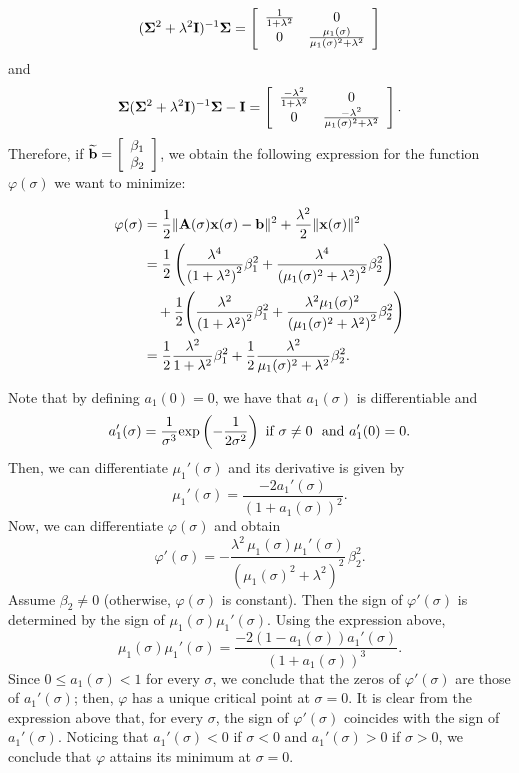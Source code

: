 \documentclass[onefignum,onetabnum]{siamart171218}
\newcommand{\bA}{{\bf A}}
\newcommand{\bI}{{\bf I}}
\newcommand{\bb}{{\bf b}}
\newcommand{\bx}{{\bf x}}
\newcommand{\bSigma}{{\bf \Sigma}}
\begin{document}
\[ (\bSigma^2 + \lambda^2 \bI)^{-1} \bSigma = \left[ \begin{array}{cc} \frac{1}{1+\lambda^2} & 0 \\  0 & \frac{\mu_1(\sigma)}{\mu_1(\sigma)^2+\lambda^2} \end{array}\right]\]
and
\[ \bSigma (\bSigma^2 + \lambda^2 \bI)^{-1} \bSigma  - \bI =  \left[ \begin{array}{cc} \frac{-\lambda^2}{1+\lambda^2} & 0 \\  0 & \frac{-\lambda^2}{\mu_1(\sigma)^2+\lambda^2} \end{array}\right].\] 
Therefore, if $\widetilde{\bb} = \left[ \begin{array}{c} \beta_1 \\ \beta_2\end{array}\right]$, we obtain
the following expression for the function $\varphi(\sigma)$ we want to minimize:

\begin{align*} 
\varphi(\sigma) &= \frac{1}{2} \| \bA(\sigma) \bx(\sigma) - \bb\|^2 + \frac{\lambda^2}{2} \| \bx(\sigma)\|^2 \\
&= \frac{1}{2} \left(\frac{\lambda^4}{\left(1 +\lambda^2\right)^2} \beta_1^2 +  \frac{\lambda^4}{\left(\mu_1(\sigma)^2+\lambda^2\right)^2} \beta_2^2 \right) \\ & \quad + \frac{1}{2}\Bigg(\frac{\lambda^2}{\left(1 +\lambda^2\right)^2} \beta_1^2 +  \frac{\lambda^2\mu_1(\sigma)^2}{\left(\mu_1(\sigma)^2+\lambda^2\right)^2} \beta_2^2 \Bigg)\\
&= \frac{1}{2}\frac{\lambda^2}{1 +\lambda^2} \beta_1^2 +  \frac{1}{2}\frac{\lambda^2}{\mu_1(\sigma)^2 +\lambda^2} \beta_2^2.   
\end{align*}

Note that by defining $a_1(0) = 0$, we have that $a_1(\sigma)$ is differentiable and 
\[a_1'(\sigma) = \frac{1}{\sigma^3}\mbox{exp}\left(-\frac{1}{2 \sigma^2}\right) \hbox{ if }  \sigma\ne 0  \ \hbox{ and } a_1'(0) = 0.\]
Then, we can differentiate $\mu_1'(\sigma)$ and its derivative is given by 
\[
\mu_1'(\sigma)= \frac{-2a_1'(\sigma)}{(1+a_1(\sigma))^2}.
\]
Now, we can differentiate $\varphi(\sigma)$ and obtain
\[
\varphi'(\sigma)
=
-\frac{\lambda^2\,\mu_1(\sigma)\mu_1'(\sigma)}
{\left(\mu_1(\sigma)^2+\lambda^2\right)^2}\,\beta_2^2.
\]
Assume $\beta_2 \ne 0$ (otherwise, $\varphi(\sigma)$ is constant). Then the sign of
$\varphi'(\sigma)$ is determined by the sign of $\mu_1(\sigma)\mu_1'(\sigma)$.
Using the expression above,
\[
\mu_1(\sigma)\mu_1'(\sigma)
=
\frac{-2\left(1-a_1(\sigma)\right)a_1'(\sigma)}{(1+a_1(\sigma))^3}.
\]
Since $0\le a_1(\sigma)<1$ for every $\sigma$, we conclude that the zeros of $\varphi'(\sigma)$ are those of $a_1'(\sigma)$; then, $\varphi$ has a unique critical point at $\sigma=0$. It is clear from the expression above that, for every $\sigma$, the sign of $\varphi'(\sigma)$ coincides with the sign of $a_1'(\sigma)$. Noticing that $a_1'(\sigma) <0$ if $\sigma<0$ and $a_1'(\sigma)>0$ if $\sigma>0$, we conclude that $\varphi$ attains its minimum at $\sigma=0$.
\end{document}
